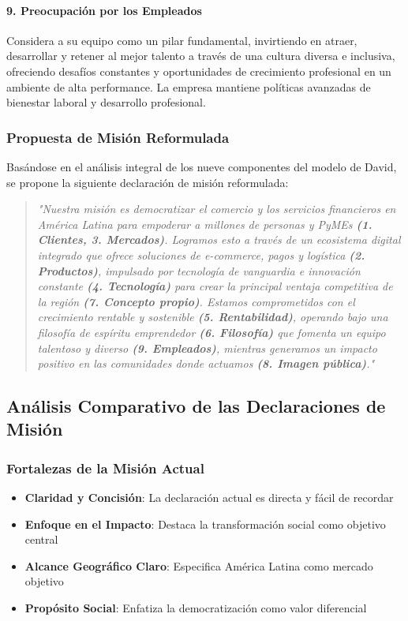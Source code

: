 \paragraph{9. Preocupación por los Empleados}
Considera a su equipo como un pilar fundamental, invirtiendo en atraer, desarrollar y retener al mejor talento a través de una cultura diversa e inclusiva, ofreciendo desafíos constantes y oportunidades de crecimiento profesional en un ambiente de alta performance. La empresa mantiene políticas avanzadas de bienestar laboral y desarrollo profesional.

\subsubsection{Propuesta de Misión Reformulada}

Basándose en el análisis integral de los nueve componentes del modelo de David, se propone la siguiente declaración de misión reformulada:

\begin{quote}
\textit{"Nuestra misión es democratizar el comercio y los servicios financieros en América Latina para empoderar a millones de personas y PyMEs \textbf{(1. Clientes, 3. Mercados)}. Logramos esto a través de un ecosistema digital integrado que ofrece soluciones de e-commerce, pagos y logística \textbf{(2. Productos)}, impulsado por tecnología de vanguardia e innovación constante \textbf{(4. Tecnología)} para crear la principal ventaja competitiva de la región \textbf{(7. Concepto propio)}. Estamos comprometidos con el crecimiento rentable y sostenible \textbf{(5. Rentabilidad)}, operando bajo una filosofía de espíritu emprendedor \textbf{(6. Filosofía)} que fomenta un equipo talentoso y diverso \textbf{(9. Empleados)}, mientras generamos un impacto positivo en las comunidades donde actuamos \textbf{(8. Imagen pública)}."}
\end{quote}

\subsection{Análisis Comparativo de las Declaraciones de Misión}

\subsubsection{Fortalezas de la Misión Actual}
\begin{itemize}
\item \textbf{Claridad y Concisión}: La declaración actual es directa y fácil de recordar
\item \textbf{Enfoque en el Impacto}: Destaca la transformación social como objetivo central
\item \textbf{Alcance Geográfico Claro}: Especifica América Latina como mercado objetivo
\item \textbf{Propósito Social}: Enfatiza la democratización como valor diferencial
\end{itemize}

